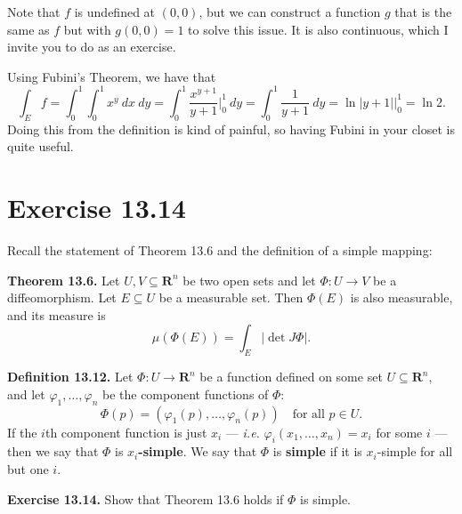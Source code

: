 \documentclass{article}
\newcommand{\R}{\mathbf{R}}
\theoremstyle{plain} %
\numberwithin{thm}{section} %
\theoremstyle{definition}
\begin{document}
    Note that \(f\) is undefined at \((0,0)\), but we can construct a function \(g\) that is the same as \(f\) but with \(g(0,0) = 1\) to solve this issue. It is also continuous, which I invite you to do as an exercise.

    Using Fubini's Theorem, we have that
    \[
        \int _E f = \int _0^1 \int _0^1 x^y\ dx\ dy = \int _0^1 \frac{x^{y+1}}{y + 1}\Big| _0^1\ dy = \int _0^1 \frac{1}{y + 1}\ dy = \ln |y + 1| \Big| _0^1 = \ln 2.
    \]
    Doing this from the definition is kind of painful, so having Fubini in your closet is quite useful.

    \section{Exercise 13.14}
    Recall the statement of Theorem 13.6 and the definition of a simple mapping:

    \textbf{Theorem 13.6.} Let $U,V\subseteq\R^n$ be two open sets and let $\Phi:U\rightarrow V$ be a diffeomorphism. Let $E\subseteq U$ be a measurable set. Then $\Phi(E)$ is also measurable, and its measure is
        \[ \mu(\Phi(E)) = \int_E |\det J\Phi|. \]

    \textbf{Definition 13.12.} Let $\Phi:U\rightarrow \R^n$ be a function defined on some set $U\subseteq \R^n$, and let $\varphi_1,\ldots,\varphi_n$ be the component functions of $\Phi$:
        \[ \Phi(p) = (\varphi_1(p), \ldots, \varphi_n(p)) \quad \text{for all $p\in U$.} \]
    If the $i$th component function is just $x_i$ --- \textit{i.e.} $\varphi_i(x_1,\ldots,x_n)=x_i$ for some $i$ --- then we say that $\Phi$ is \textbf{$x_i$-simple}. We say that $\Phi$ is \textbf{simple} if it is $x_i$-simple for all but one $i$.

    \textbf{Exercise 13.14.} Show that Theorem 13.6 holds if \(\Phi\) is simple.
\end{document}
